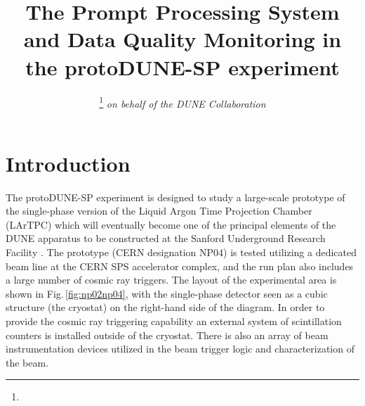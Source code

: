 \documentclass{webofc}
\newcommand{\pd}{protoDUNE\xspace}
\begin{document}
%
\title{The Prompt Processing System and Data Quality Monitoring in the \pd-SP experiment}
%
\author{ 
\fnsep\thanks{} \it{on behalf of the DUNE Collaboration}
}




%
\maketitle
%
\section{Introduction}
\label{sec:intro}
The \pd-SP experiment is designed to study a large-scale prototype of the single-phase version of
the Liquid Argon Time Projection Chamber (LArTPC) which will eventually become one
of the principal elements of the DUNE apparatus to be constructed at the Sanford Underground
Research Facility \cite{cdrVol1, cdrVol4}. The prototype (CERN designation NP04) is tested
utilizing a dedicated beam line  at the CERN SPS accelerator complex, and the run plan also includes
a large number of cosmic ray triggers. The layout of the experimental area is shown in Fig.\,\ref{fig:np02np04},
with the single-phase detector seen as a cubic structure (the cryostat) on the right-hand side of the diagram. 
In order to provide the cosmic ray triggering capability an external system of scintillation counters is installed
outside of the cryostat. There is also an array of beam instrumentation devices utilized in the beam
trigger logic and characterization of the beam.
\end{document}
